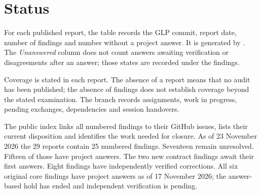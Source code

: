 \section{Status}

For each published report, the table records the GLP commit, report date, number of findings and number without a project answer. It is generated by . The \emph{Unanswered} column does not count answers awaiting verification or disagreements after an answer; those states are recorded under the findings.

Coverage is stated in each report. The absence of a report means that no audit has been published; the absence of findings does not establish coverage beyond the stated examination. The  branch records assignments, work in progress, pending exchanges, dependencies and session handovers.

The public  index links all numbered findings to their GitHub issues, lists their current disposition and identifies the work needed for closure. As of 23 November 2026 the 29 reports contain 25 numbered findings. Seventeen remain unresolved. Fifteen of those have project answers. The two new contract findings await their first answers. Eight findings have independently verified corrections. All six original core findings have project answers as of 17 November 2026; the answer-based hold has ended and independent verification is pending.


